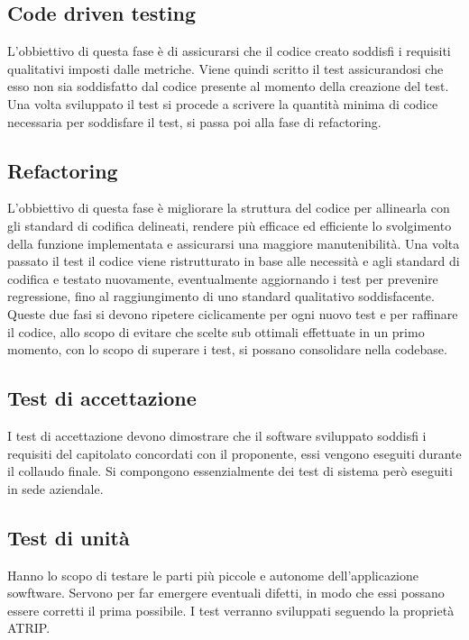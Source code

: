 \subsection{Code driven testing}
L'obbiettivo di questa fase è di assicurarsi che il codice creato soddisfi i requisiti qualitativi imposti dalle metriche. Viene quindi scritto il test assicurandosi che esso non sia soddisfatto dal codice presente al momento della creazione del test. Una volta sviluppato il test si procede a scrivere la quantità minima di codice necessaria per soddisfare il test, si passa poi alla fase di refactoring.
\subsection{Refactoring} 
L'obbiettivo di questa fase è migliorare la struttura del codice per allinearla con gli standard di codifica delineati, rendere più efficace ed efficiente lo svolgimento della funzione implementata e assicurarsi una maggiore manutenibilità. Una volta passato il test il codice viene ristrutturato in base alle necessità e agli standard di codifica e testato nuovamente, eventualmente aggiornando i test per prevenire regressione, fino al raggiungimento di uno standard qualitativo soddisfacente. \newline{}
\newline{}
Queste due fasi si devono ripetere ciclicamente per ogni nuovo test e per raffinare il codice, allo scopo di evitare che scelte sub ottimali effettuate in un primo momento, con lo scopo di superare i test, si possano consolidare nella codebase.


\subsection{Test di accettazione}
I test di accettazione devono dimostrare che il software sviluppato soddisfi i requisiti del capitolato concordati con il proponente, essi vengono eseguiti durante il collaudo finale.
Si compongono essenzialmente dei test di sistema però eseguiti in sede aziendale.

\subsection{Test di unità}
Hanno lo scopo di testare le parti più piccole e autonome dell'applicazione sowftware. Servono per far emergere eventuali difetti, in modo che essi possano essere corretti il prima possibile.
I test verranno sviluppati seguendo la proprietà ATRIP.